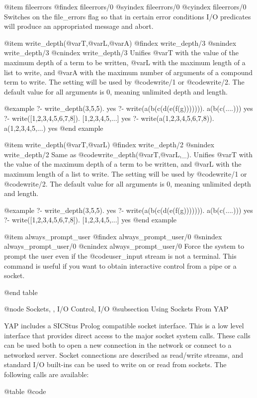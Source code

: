 {{{{{{@item fileerrors
@findex fileerrors/0
@syindex fileerrors/0
@cyindex fileerrors/0
Switches on the file_errors flag so that in certain error conditions
I/O predicates will produce an appropriated message and abort.

@item write_depth(@var{T},@var{L},@var{A})
@findex write_depth/3
@snindex write_depth/3
@cnindex write_depth/3
Unifies @var{T} with the value of the maximum depth of a term to be
written, @var{L} with the maximum length of a list to write, and @var{A}
with the maximum number of arguments of a compound term to write. The
setting will be used by @code{write/1} or @code{write/2}. The default
value for all arguments is 0, meaning unlimited depth and length.

@example
?- write_depth(3,5,5).
yes
?- write(a(b(c(d(e(f(g))))))).
a(b(c(....)))
yes
?- write([1,2,3,4,5,6,7,8]).
[1,2,3,4,5,...]
yes
?- write(a(1,2,3,4,5,6,7,8)).
a(1,2,3,4,5,...)
yes
@end example

@item write_depth(@var{T},@var{L})
@findex write_depth/2
@snindex write_depth/2
Same as @code{write_depth(@var{T},@var{L},_)}. Unifies @var{T} with the
value of the maximum depth of a term to be
written, and @var{L} with the maximum length of a list to write. The
setting will be used by @code{write/1} or @code{write/2}. The default
value for all arguments is 0, meaning unlimited depth and length.

@example
?- write_depth(3,5,5).
yes
?- write(a(b(c(d(e(f(g))))))).
a(b(c(....)))
yes
?- write([1,2,3,4,5,6,7,8]).
[1,2,3,4,5,...]
yes
@end example

@item always_prompt_user
@findex always_prompt_user/0
@snindex always_prompt_user/0
@cnindex always_prompt_user/0
Force the system to prompt the user even if the @code{user_input} stream
is not a terminal. This command is useful if you want to obtain
interactive control from a pipe or a socket.

@end table

@node Sockets, , I/O Control, I/O
@subsection Using Sockets From YAP

YAP includes a SICStus Prolog compatible socket interface. This
is a low level interface that provides direct access to the major socket
system calls. These calls can be used both to open a new connection in
the network or connect to a networked server. Socket connections are
described as read/write streams, and standard I/O built-ins can be used
to write on or read from sockets. The following calls are available:

@table @code

}}}}}}
